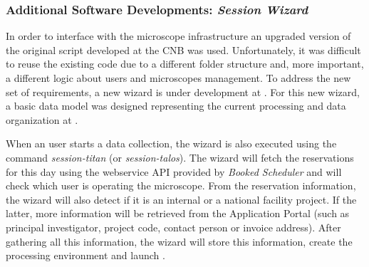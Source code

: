 \subsubsection{Additional Software Developments: \emph{Session Wizard}}
In order to interface \scipion with the microscope infrastructure an upgraded version of the original script developed at the CNB was used. Unfortunately, it was difficult to reuse the existing code due to a different folder structure and, more important, a different logic about users and microscopes management. To address the new set of requirements, a new wizard is under development at \scilifelab. For this new wizard, a basic data model was designed representing the current processing and data organization at \scilifelab. %


When an user starts a data collection, the wizard is also executed using the command \textit{session-titan} (or \textit{session-talos}). The wizard will fetch the reservations for this day using the webservice API provided by \emph{Booked Scheduler} and will check which user is operating the microscope. From the reservation information, the wizard will also detect if it is an internal or a national facility project. If the latter, more information will be retrieved from the Application Portal (such as principal investigator, project code, contact person or invoice address). After gathering all this information, the wizard will store this information, create the processing environment and launch \scipion. %

